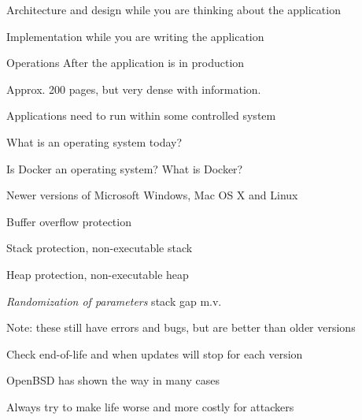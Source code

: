 \documentclass[Screen16to9,17pt]{foils}
\begin{document}
\begin{list2}
\item Architecture and design while you are thinking about the application
\item Implementation while you are writing the application
\item Operations After the application is in production
\item Approx. 200 pages, but very dense with information.
\end{list2}




\begin{list2}
\item Applications need to run within some controlled system
\item What is an operating system today?
\item Is Docker an operating system? What is Docker?
\end{list2}




\begin{list1}
\item Newer versions of Microsoft Windows, Mac OS X and Linux
\begin{list2}
\item Buffer overflow protection
\item Stack protection, non-executable stack
\item Heap protection, non-executable heap
\item \emph{Randomization of parameters} stack gap m.v.
\end{list2}
\item Note: these still have errors and bugs, but are better than older versions
\item Check end-of-life and when updates will stop for each version
\item OpenBSD has shown the way in many cases\\ 
\end{list1}

\vskip 1cm

\centerline{Always try to make life worse and more costly for attackers}





\end{document}
